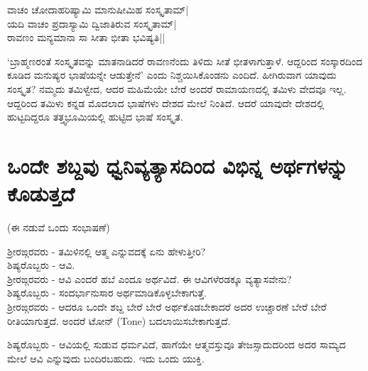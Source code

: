 \begin{shloka}
ವಾಚಂ ಚೋದಾಹರಿಷ್ಯಾಮಿ ಮಾನುಷೀಮಿಹ ಸಂಸ್ಕೃತಾಮ್|\label{232b}\\
ಯದಿ ವಾಚಂ ಪ್ರದಾಸ್ಯಾಮಿ ದ್ವಿಜಾತಿರುವ ಸಂಸ್ಕೃತಾಮ್|\\
ರಾವಣಂ ಮನ್ಯಮಾನಾ‌ ಸಾ ಸೀತಾ ಭೀತಾ ಭವಿಷ್ಯತಿ||
\end{shloka}

`ಬ್ರಾಹ್ಮಣರಂತೆ ಸಂಸ್ಕೃತವನ್ನು ಮಾತನಾಡಿದರೆ ರಾವಣನೆಂದು ತಿಳಿದು ಸೀತೆ ಭೀತಳಾಗುತ್ತಾಳೆ. ಆದ್ದರಿಂದ ಸಂಸ್ಕಾರದಿಂದ ಕೂಡಿದ ಮನುಷ್ಯರ ಭಾಷೆಯನ್ನೇ ಆಡುತ್ತೇನೆ' ಎಂದು ನಿಶ್ಚಯಿಸಿಕೊಂಡನು ಎಂದಿದೆ. ಹೀಗಿರುವಾಗ ಯಾವುದು ಸಂಸ್ಕೃತ? ನಮ್ಮದು ತಮಿಳ್ವೇದ, ಆದರ ಮಹಿಮೆಯೇ ಬೇರೆ ಅಂದರೆ ರಾಮಾಯಣದಲ್ಲಿ ತಮಿಳು ವೇದವೂ ಇಲ್ಲ. ಆದ್ದರಿಂದ ತಮಿಳು ಕನ್ನಡ ಮೊದಲಾದ ಭಾಷೆಗಳು ದೇಶದ ಮೇಲೆ ನಿಂತಿದೆ. ಆದರೆ ಯಾವುದೇ ದೇಶದಲ್ಲಿ ಹುಟ್ಟದಿದ್ದರೂ ತತ್ತ್ವಭೂಮಿಯಲ್ಲಿ ಹುಟ್ಟಿದ ಭಾಷೆ ಸಂಸ್ಕೃತ. 

\section*{ಒಂದೇ ಶಬ್ದವು ಧ್ವನಿವ್ಯತ್ಯಾಸದಿಂದ ವಿಭಿನ್ನ ಅರ್ಥಗಳನ್ನು ಕೊಡುತ್ತದೆ}

(ಈ ನಡುವೆ ಒಂದು ಸಂಭಾಷಣೆ)

ಶ್ರೀರಙ್ಗರವರು - ತಮಿಳಿನಲ್ಲಿ ಆತ್ಮ ಎನ್ನುವದಕ್ಕೆ ಏನು ಹೇಳುತ್ತೀರಿ? \\
ಶಿಷ್ಯರೊಬ್ಬರು - ಆವಿ. \\
ಶ್ರೀರಙ್ಗರವರು - ಆವಿ ಎಂದರೆ ಹಬೆ ಎಂದೂ ಅರ್ಥವಿದೆ. ಈ ಆವಿಗಳೆರಡಕ್ಕೂ ವ್ಯತ್ಯಾಸವೇನು? \\
ಶಿಷ್ಯರೊಬ್ಬರು - ಸಂದರ್ಭಾನುಸಾರ ಅರ್ಥಮಾಡಿಕೊಳ್ಳಬೇಕಾಗುತ್ತೆ.\\
ಶ್ರೀರಙ್ಗರವರು - ಆದರೂ ಒಂದೇ ಶಬ್ದ ಬೇರೆ ಬೇರೆ ಅರ್ಥಕೊಡಬೇಕಾದರೆ  ಅದರ ಉಚ್ಚಾರಣೆ ಬೇರೆ ಬೇರೆ ರೀತಿಯಾಗುತ್ತದೆ. ಅಂದರೆ ಟೋನ್ ({\eng Tone}) ಬದಲಾಯಿಸಬೇಕಾಗುತ್ತದೆ.

ಶಿಷ್ಯರೊಬ್ಬರು - ಆವಿಯಲ್ಲಿ ಸುಡುವ ಧರ್ಮವಿದೆ, ಹಾಗೆಯೇ ಆತ್ಮವಸ್ತುವೂ ತೇಜಸ್ಸಾದುದರಿಂದ ಅದರ ಸಾಮ್ಯದ ಮೇಲೆ ಆವಿ ಎನ್ನುವುದು ಬಂದಿರಬಹುದು. ಇದು ಒಂದು ಯುಕ್ತಿ. 


